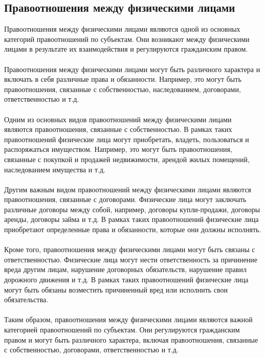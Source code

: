 \documentclass{article}
\begin{document}
\subsection{Правоотношения между физическими лицами}
Правоотношения между физическими лицами являются одной из основных категорий правоотношений по субъектам. Они возникают между физическими лицами в результате их взаимодействия и регулируются гражданским правом.\\
~\\
Правоотношения между физическими лицами могут быть различного характера и включать в себя различные права и обязанности. Например, это могут быть правоотношения, связанные с собственностью, наследованием, договорами, ответственностью и т.д.\\
~\\
Одним из основных видов правоотношений между физическими лицами являются правоотношения, связанные с собственностью. В рамках таких правоотношений физические лица могут приобретать, владеть, пользоваться и распоряжаться имуществом. Например, это могут быть правоотношения, связанные с покупкой и продажей недвижимости, арендой жилых помещений, наследованием имущества и т.д.\\
~\\
Другим важным видом правоотношений между физическими лицами являются правоотношения, связанные с договорами. Физические лица могут заключать различные договоры между собой, например, договоры купли-продажи, договоры аренды, договоры займа и т.д. В рамках таких правоотношений физические лица приобретают определенные права и обязанности, которые они должны исполнять.\\
~\\
Кроме того, правоотношения между физическими лицами могут быть связаны с ответственностью. Физические лица могут нести ответственность за причинение вреда другим лицам, нарушение договорных обязательств, нарушение правил дорожного движения и т.д. В рамках таких правоотношений физические лица могут быть обязаны возместить причиненный вред или исполнить свои обязательства.\\
~\\
Таким образом, правоотношения между физическими лицами являются важной категорией правоотношений по субъектам. Они регулируются гражданским правом и могут быть различного характера, включая правоотношения, связанные с собственностью, договорами, ответственностью и т.д.
\end{document}
